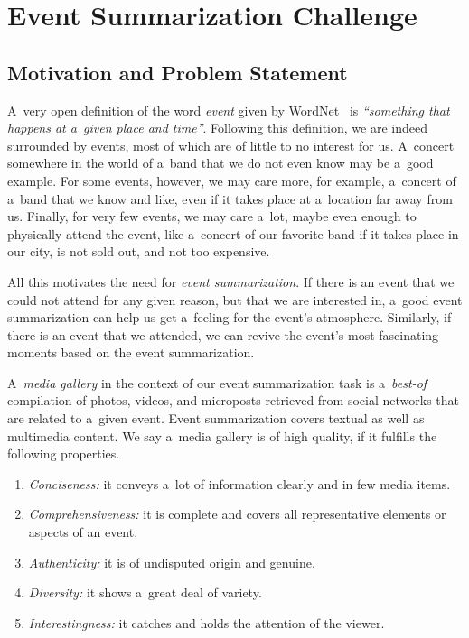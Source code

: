 \chapter{Event Summarization Challenge}
\label{cha:introduction}

\ifpdf
    \graphicspath{{1_introduction/figures/PNG/}{1_introduction/figures/PDF/}{1_introduction/figures/}}
\else
    \graphicspath{{1_introduction/figures/EPS/}{1_introduction/figures/}}
\fi

\section{Motivation and Problem Statement}

A~very open definition of the word \emph{event}
given by WordNet~\cite{fellbaum1998wordnet,miller1995wordnet} is
\emph{``something that happens at a~given place and time''}.
Following this definition,
we are indeed surrounded by events,
most of which are of little to no interest for us.
A~concert somewhere in the world of a~band
that we do not even know may be a~good example.
For some events, however, we may care more, for example,
a~concert of a~band that we know and like,
even if it takes place at a~location far away from us.
Finally, for very few events, we may care a~lot,
maybe even enough to physically attend the event,
like a~concert of our favorite band
if it takes place in our city, is not sold out,
and not too expensive.

All this motivates the need for \emph{event summarization}.
If there is an event that we could not attend
for any given reason,
but that we are interested in,
a~good event summarization can help us get a~feeling
for the event's atmosphere.
Similarly, if there is an event that we attended,
we can revive the event's most fascinating moments
based on the event summarization.

A~\emph{media gallery} in the context of
our event summarization task is
a~\emph{best-of} compilation of photos, videos,
and microposts retrieved from social networks
that are related to a~given event.
Event summarization covers textual
as well as multimedia content.
We say a~media gallery is of high quality,
if it fulfills the following properties.

\begin{enumerate}
  \item \textit{Conciseness:}
        it conveys a~lot of information clearly
        and in few media items.
  \item \textit{Comprehensiveness:}
        it is complete and covers all representative
        elements or aspects of an event.
  \item \textit{Authenticity:}
        it is of undisputed origin and genuine.
  \item \textit{Diversity:}
        it shows a~great deal of variety.
  \item \textit{Interestingness:}
        it catches and holds the attention of the viewer.     
\end{enumerate}

